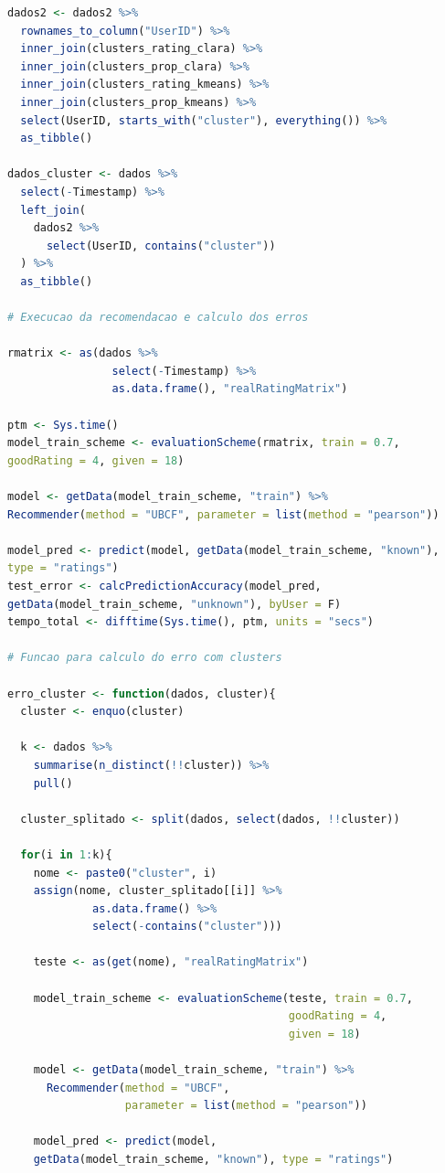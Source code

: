 \documentclass[12pt,a4paper,header]{abnt}
\begin{document}
\begin{lstlisting}[language=R]
dados2 <- dados2 %>% 
  rownames_to_column("UserID") %>% 
  inner_join(clusters_rating_clara) %>% 
  inner_join(clusters_prop_clara) %>%
  inner_join(clusters_rating_kmeans) %>% 
  inner_join(clusters_prop_kmeans) %>% 
  select(UserID, starts_with("cluster"), everything()) %>% 
  as_tibble()
  
dados_cluster <- dados %>% 
  select(-Timestamp) %>% 
  left_join(
    dados2 %>% 
      select(UserID, contains("cluster"))
  ) %>% 
  as_tibble()

# Execucao da recomendacao e calculo dos erros

rmatrix <- as(dados %>% 
                select(-Timestamp) %>% 
                as.data.frame(), "realRatingMatrix")

ptm <- Sys.time()
model_train_scheme <- evaluationScheme(rmatrix, train = 0.7, 
goodRating = 4, given = 18)

model <- getData(model_train_scheme, "train") %>% 
Recommender(method = "UBCF", parameter = list(method = "pearson"))

model_pred <- predict(model, getData(model_train_scheme, "known"), 
type = "ratings")
test_error <- calcPredictionAccuracy(model_pred, 
getData(model_train_scheme, "unknown"), byUser = F)
tempo_total <- difftime(Sys.time(), ptm, units = "secs")

# Funcao para calculo do erro com clusters

erro_cluster <- function(dados, cluster){
  cluster <- enquo(cluster)
  
  k <- dados %>% 
    summarise(n_distinct(!!cluster)) %>% 
    pull()
  
  cluster_splitado <- split(dados, select(dados, !!cluster))
  
  for(i in 1:k){
    nome <- paste0("cluster", i)
    assign(nome, cluster_splitado[[i]] %>% 
             as.data.frame() %>% 
             select(-contains("cluster")))
  
    teste <- as(get(nome), "realRatingMatrix")
  
    model_train_scheme <- evaluationScheme(teste, train = 0.7, 
                                           goodRating = 4, 
                                           given = 18)
  
    model <- getData(model_train_scheme, "train") %>% 
      Recommender(method = "UBCF", 
                  parameter = list(method = "pearson"))
  
    model_pred <- predict(model, 
    getData(model_train_scheme, "known"), type = "ratings")
    

\end{lstlisting}
\end{document}
